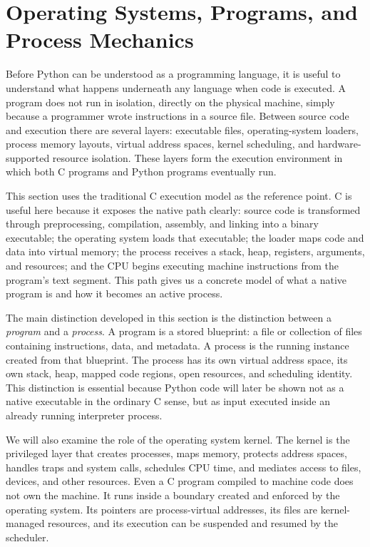 \section{Operating Systems, Programs, and Process Mechanics}

Before Python can be understood as a programming language, it is useful to understand what happens underneath any language when code is executed. A program does not run in isolation, directly on the physical machine, simply because a programmer wrote instructions in a source file. Between source code and execution there are several layers: executable files, operating-system loaders, process memory layouts, virtual address spaces, kernel scheduling, and hardware-supported resource isolation. These layers form the execution environment in which both C programs and Python programs eventually run.

This section uses the traditional C execution model as the reference point. C is useful here because it exposes the native path clearly: source code is transformed through preprocessing, compilation, assembly, and linking into a binary executable; the operating system loads that executable; the loader maps code and data into virtual memory; the process receives a stack, heap, registers, arguments, and resources; and the CPU begins executing machine instructions from the program's text segment. This path gives us a concrete model of what a native program is and how it becomes an active process.

The main distinction developed in this section is the distinction between a \emph{program} and a \emph{process}. A program is a stored blueprint: a file or collection of files containing instructions, data, and metadata. A process is the running instance created from that blueprint. The process has its own virtual address space, its own stack, heap, mapped code regions, open resources, and scheduling identity. This distinction is essential because Python code will later be shown not as a native executable in the ordinary C sense, but as input executed inside an already running interpreter process.

We will also examine the role of the operating system kernel. The kernel is the privileged layer that creates processes, maps memory, protects address spaces, handles traps and system calls, schedules CPU time, and mediates access to files, devices, and other resources. Even a C program compiled to machine code does not own the machine. It runs inside a boundary created and enforced by the operating system. Its pointers are process-virtual addresses, its files are kernel-managed resources, and its execution can be suspended and resumed by the scheduler.


